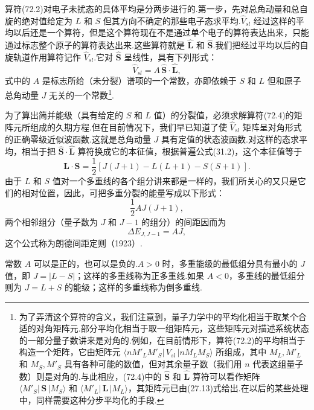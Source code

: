 算符(72.2)对电子未扰态的具体平均是分两步进行的.第一步，先对总角动量和总自旋的绝对值给定为 $L$ 和 $S$ 但其方向不确定的那些电子态求平均.$\hat{V}_{sl}$ 经过这样的平均以后还是一个算符，但是这个算符现在不是通过单个电子的算符表达出来，只能通过标志整个原子的算符表达出来.这些算符就是 $\hat{\boldsymbol{L}}$ 和 $\hat{\boldsymbol{S}}$.我们把经过平均以后的自旋轨道作用算符记作 $\hat{V}_{sl}$.它对 $\hat{\boldsymbol{S}}$ 呈线性，具有下列形式：
\begin{equation}
  \hat{V}_{sl}=A\,\hat{\boldsymbol{S}}\cdot\hat{\boldsymbol{L}},
\end{equation}
式中的 $A$ 是标志所给（未分裂）谱项的一个常数，亦即依赖于 $S$ 和 $L$ 但和原子总角动量 $J$ 无关的一个常数\footnote{为了弄清这个算符的含义，我们注意到，量子力学中的平均化相当于取某个合适的对角矩阵元.部分平均化相当于取一组矩阵元，这些矩阵元对描述系统状态的一部分量子数讲来是对角的.例如，在目前情形下，算符(72.2)的平均相当于构造一个矩阵，它由矩阵元 $\langle nM'_LM'_S|\,V_{sl}\,|nM_LM_S\rangle$ 所组成，其中 $M_L,M'_L$ 和 $M_S,M'_S$ 具有各种可能的数值，但对其余量子数（我们用 $n$ 代表这组量子数）则是对角的.与此相应，(72.4)中的 $\hat{\boldsymbol{S}}$ 和 $\hat{\boldsymbol{L}}$ 算符可以看作矩阵 $\langle M'_S|\,\boldsymbol{S}\,|M_S\rangle$ 和 $\langle M'_L|\,\boldsymbol{L}\,|M_L\rangle$，其矩阵元已由(27.13)式给出.在以后的某些处理中，同样需要这种分步平均化的手段.}.

为了算出简并能级（具有给定的 $S$ 和 $L$ 值）的分裂值，必须求解算符(72.4)的矩阵元所组成的久期方程.但在目前情况下，我们早已知道了使 $\hat{V}_{sl}$ 矩阵呈对角形式的正确零级近似波函数.这就是总角动量 $J$ 具有定值的状态波函数.对这样的态求平均，相当于把 $\hat{\boldsymbol{S}}\cdot\hat{\boldsymbol{L}}$ 算符换成它的本征值，根据普遍公式(31.2)，这个本征值等于
\begin{equation*}
  \boldsymbol{L}\cdot\boldsymbol{S}
  =\frac{1}{2}\left[J(J+1)-L(L+1)-S(S+1)\right].
\end{equation*}
由于 $L$ 和 $S$ 值对一个多重线的各个组分讲来都是一样的，我们所关心的又只是它们的相对位置，因此，可把多重分裂的能量写成以下形式：
\begin{equation}
  \frac{1}{2}AJ(J+1),
\end{equation}
两个相邻组分（量子数为 $J$ 和 $J-1$ 的组分）的间距因而为
\begin{equation}
  \Delta E_{J,J-1}=AJ,
\end{equation}
这个公式称为朗德间距定则（1923）.

常数 $A$ 可以是正的，也可以是负的.$A>0$ 时，多重能级的最低组分具有最小的 $J$ 值，即 $J=|L-S|$；这样的多重线称为正多重线.如果 $A<0$，多重线的最低组分则为 $J=L+S$ 的能级；这样的多重线称为倒多重线.

